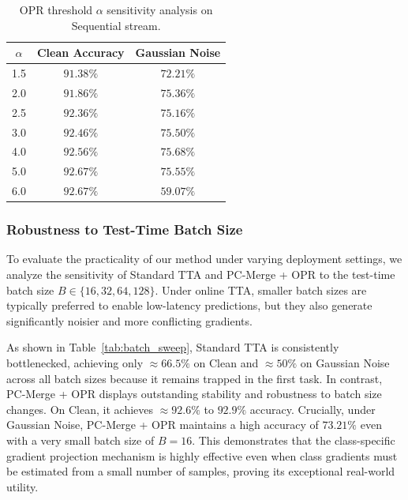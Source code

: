 \documentclass{article}
\theoremstyle{plain}
\theoremstyle{definition}
\theoremstyle{remark}
\begin{document}
\begin{table}[h]
\caption{OPR threshold $\alpha$ sensitivity analysis on Sequential stream.}
\label{tab:alpha_sweep}
\vskip 0.1in
\begin{center}
\begin{small}
\scshape
\begin{tabular}{ccc}
\toprule
$\alpha$ & Clean Accuracy & Gaussian Noise \\
\midrule
1.5 & $91.38\%$ & $72.21\%$ \\
2.0 & $91.86\%$ & $75.36\%$ \\
2.5 & $92.36\%$ & $75.16\%$ \\
3.0 & $92.46\%$ & $75.50\%$ \\
4.0 & $92.56\%$ & $75.68\%$ \\
5.0 & $92.67\%$ & $75.55\%$ \\
6.0 & $92.67\%$ & $59.07\%$ \\
\bottomrule
\end{tabular}
\end{small}
\end{center}
\vskip -0.1in
\end{table}

\subsubsection{Robustness to Test-Time Batch Size}
To evaluate the practicality of our method under varying deployment settings, we analyze the sensitivity of Standard TTA and PC-Merge + OPR to the test-time batch size $B \in \{16, 32, 64, 128\}$. Under online TTA, smaller batch sizes are typically preferred to enable low-latency predictions, but they also generate significantly noisier and more conflicting gradients.

As shown in Table~\ref{tab:batch_sweep}, Standard TTA is consistently bottlenecked, achieving only $\approx 66.5\%$ on Clean and $\approx 50\%$ on Gaussian Noise across all batch sizes because it remains trapped in the first task. In contrast, PC-Merge + OPR displays outstanding stability and robustness to batch size changes. On Clean, it achieves $\approx 92.6\%$ to $92.9\%$ accuracy. Crucially, under Gaussian Noise, PC-Merge + OPR maintains a high accuracy of $73.21\%$ even with a very small batch size of $B=16$. This demonstrates that the class-specific gradient projection mechanism is highly effective even when class gradients must be estimated from a small number of samples, proving its exceptional real-world utility.
\end{document}
